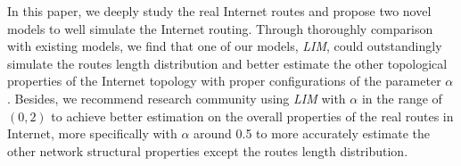 \documentclass[a4paper]{llncs}
\begin{document}
In this paper, we deeply study the real Internet routes and propose two novel models to well simulate the
Internet routing. Through thoroughly comparison with existing models, we
find that one of our models, \textit{LIM}, could outstandingly
simulate the routes length distribution and better estimate the other
topological properties of the Internet topology with proper
configurations of the parameter $\alpha$. Besides, we recommend research
community using \textit{LIM} with $\alpha$ in the range of $(0,2)$ to achieve better estimation on the
overall properties of the real routes in Internet, more specifically with $\alpha$ around 0.5 to more
accurately estimate the other network structural properties except the routes
length distribution.
\begin{comment}
What's more, through deeply
resurveying the sampling bias problem of traceroute-like methods by
considering \textit{LIM}, we conjecture that the corresponding
sampling bias is due to \textit{USPM} adopted previously. While,
the true traceroute in reality might be less biased, at least.
\end{comment}
\end{document}
